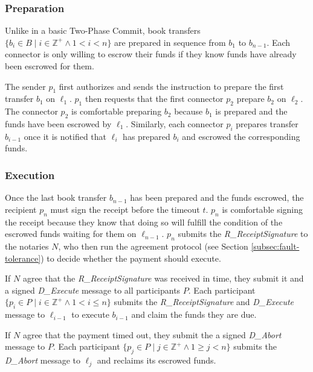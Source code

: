 \documentclass[letterpaper,twocolumn,10pt]{article}
\begin{document}
\subsubsection{Preparation}


Unlike in a basic Two-Phase Commit, book transfers 
$ \{ b_i \in B \mid i \in \mathbb{Z}^+ \land 1 < i < n \} $
are prepared in sequence from $b_1$ to $b_{n-1}$. Each connector is only willing to escrow their funds if they know funds have already been escrowed for them. 

The sender $p_1$ first authorizes and sends the instruction to prepare the first transfer $b_1$ on $\ell_1$. $p_1$ then requests that the first connector $p_2$ prepare $b_2$ on $\ell_2$. The connector $p_2$ is comfortable preparing $b_2$ because $b_1$ is prepared and the funds have been escrowed by $\ell_1$. Similarly, each connector $p_i$ prepares transfer $b_{i-1}$ once it is notified that $\ell_i$ has prepared $b_i$ and escrowed the corresponding funds.

\subsubsection{Execution}

Once the last book transfer $b_{n-1}$ has been prepared and the funds escrowed, the recipient $p_n$ must sign the receipt before the timeout $t$. $p_n$ is comfortable signing the receipt because they know that doing so will fulfill the condition of the escrowed funds waiting for them on $\ell_{n-1}$. $p_n$ submits the \textit{R\_ReceiptSignature} to the notaries $N$, who then run the agreement protocol (see Section \ref{subsec:fault-tolerance}) to decide whether the payment should execute.

If $N$ agree that the \textit{R\_ReceiptSignature} was received in time, they submit it and a signed \textit{D\_Execute} message to all participants $P$. Each participant $ \{ p_i \in P \mid i \in \mathbb{Z}^+ \land 1 < i \leq n \} $ submits the \textit{R\_ReceiptSignature} and \textit{D\_Execute} message to $\ell_{i-1}$ to execute $b_{i-1}$ and claim the funds they are due.

If $N$ agree that the payment timed out, they submit the a signed \textit{D\_Abort} message to $P$. Each participant $ \{ p_j \in P \mid j \in \mathbb{Z}^+ \land 1 \geq j < n \} $ submits the \textit{D\_Abort} message to $\ell_j$ and reclaims its escrowed funds. 
\end{document}

